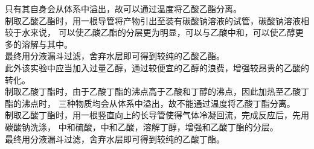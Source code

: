 \documentclass[UTF8]{ctexart}
\begin{document}
    只有其自身会从体系中溢出，故可以通过温度将乙酸乙酯分离。\\[3mm]
    制取乙酸乙酯时，用一根导管将产物引出至装有碳酸钠溶液的试管，碳酸钠溶液相较于水来说，
    可以使乙酸乙酯的分层更为明显，可以与乙酸中和，可以使乙醇更多的溶解与其中。\\[3mm]
    最终用分液漏斗过滤，舍弃水层即可得到较纯的乙酸乙酯。\\[3mm]
    此外该实验中应当加入过量乙醇，通过较便宜的乙醇的浪费，增强较昂贵的乙酸的转化。\\[8mm]
    制取乙酸丁酯时，由于乙酸丁酯的沸点高于乙酸和丁醇的沸点，因此加热至乙酸丁酯的沸点时，
    三种物质均会从体系中溢出，故不能通过温度将乙酸丁酯分离。\\[3mm]
    制取乙酸丁酯时，用一根竖直向上的长导管使得气体冷凝回流，完成反应后，先用碳酸钠洗涤，
    中和硫酸，中和乙酸，溶解丁醇，增强和乙酸丁酯的分层。\\[3mm]
    最终用分液漏斗过滤，舍弃水层即可得到较纯的乙酸丁酯。

\newpage
\end{document}
